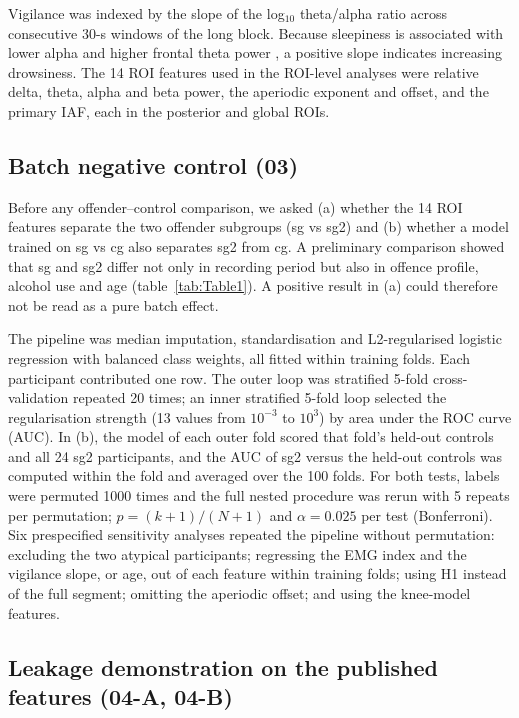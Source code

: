 Vigilance was indexed by the slope of the log$_{10}$ theta/alpha ratio across consecutive 30-s windows of the long block. Because sleepiness is associated with lower alpha and higher frontal theta power \cite{Strijkstra2003}, a positive slope indicates increasing drowsiness. The 14 ROI features used in the ROI-level analyses were relative delta, theta, alpha and beta power, the aperiodic exponent and offset, and the primary IAF, each in the posterior and global ROIs.

\subsection{Batch negative control (03)}
\label{sec:negcontrol}

Before any offender--control comparison, we asked (a) whether the 14 ROI features separate the two offender subgroups (sg vs sg2) and (b) whether a model trained on sg vs cg also separates sg2 from cg. A preliminary comparison showed that sg and sg2 differ not only in recording period but also in offence profile, alcohol use and age (table~\ref{tab:Table1}). A positive result in (a) could therefore not be read as a pure batch effect.

The pipeline was median imputation, standardisation and L2-regularised logistic regression with balanced class weights, all fitted within training folds. Each participant contributed one row. The outer loop was stratified 5-fold cross-validation repeated 20 times; an inner stratified 5-fold loop selected the regularisation strength (13 values from $10^{-3}$ to $10^{3}$) by area under the ROC curve (AUC). In (b), the model of each outer fold scored that fold's held-out controls and all 24 sg2 participants, and the AUC of sg2 versus the held-out controls was computed within the fold and averaged over the 100 folds. For both tests, labels were permuted 1000 times and the full nested procedure was rerun with 5 repeats per permutation; $p = (k+1)/(N+1)$ and $\alpha = 0.025$ per test (Bonferroni). Six prespecified sensitivity analyses repeated the pipeline without permutation: excluding the two atypical participants; regressing the EMG index and the vigilance slope, or age, out of each feature within training folds; using H1 instead of the full segment; omitting the aperiodic offset; and using the knee-model features.

\subsection{Leakage demonstration on the published features (04-A, 04-B)}
\label{sec:leakage}

